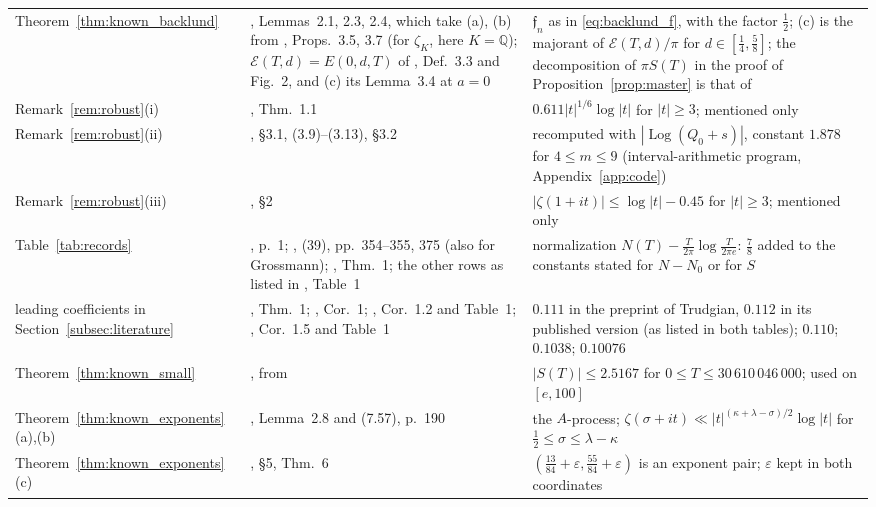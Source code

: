 \documentclass[11pt,a4paper]{article}
\makeatletter
\numberwithin{equation}{section}
\DeclareRobustCommand{\CGref}[1]{\ref{#1}}
\DeclareRobustCommand{\CGeqref}[1]{\eqref{#1}}
\DeclareRobustCommand{\CGcite}[2][]{\if\relax\detokenize{#1}\relax\cite{#2}\else\cite[#1]{#2}\fi}
\let\CG@origref\ref
\let\CG@origeqref\eqref
\newcommand{\CG@gettip}[1]{\@ifundefined{CGTip@#1}{#1}{\csname CGTip@#1\endcsname}}
\newcommand{\CG@getbib}[1]{\@ifundefined{CGBib@#1}{#1}{\csname CGBib@#1\endcsname}}
\DeclareRobustCommand{\CGref}[1]{\pdftooltip{\CG@origref{#1}}{\CG@gettip{#1}}}
\DeclareRobustCommand{\CGeqref}[1]{\pdftooltip{\CG@origeqref{#1}}{\CG@gettip{#1}}}
\DeclareRobustCommand{\CGcite}[2][]{\pdftooltip{\if\relax\detokenize{#1}\relax\cite{#2}\else\cite[#1]{#2}\fi}{\CG@getbib{#2}}}
\theoremstyle{definition}
\theoremstyle{remark}
\newcommand{\Nz}{N_0} %
\makeatother
\begin{document}
\begin{center}
\begin{longtable}{p{}p{}p{}}
Theorem~\CGref{thm:known_backlund} & \CGcite{BellottiWong2025}, Lemmas~2.1, 2.3, 2.4, which take (a), (b) from \CGcite{HasanalizadeShenWong2021}, Props.~3.5, 3.7 (for $\zeta_K$, here $K=\mathbb Q$); $\mathcal E(T,d)=E(0,d,T)$ of \CGcite{BennettEtAl2021}, Def.~3.3 and Fig.~2, and (c) its Lemma~3.4 at $a=0$ & $\mathfrak f_n$ as in \CGeqref{eq:backlund_f}, with the factor $\frac12$; (c) is the majorant of $\mathcal E(T,d)/\pi$ for $d\in[\frac14,\frac58]$; the decomposition of $\pi S(T)$ in the proof of Proposition~\CGref{prop:master} is that of \CGcite[\S3]{BellottiWong2025}\\
Remark~\CGref{rem:robust}(i) & \CGcite{Revers2026}, Thm.~1.1 & $0.611|t|^{1/6}\log|t|$ for $|t|\ge3$; mentioned only\\
Remark~\CGref{rem:robust}(ii) & \CGcite{Yang2024}, \S3.1, (3.9)--(3.13), \S3.2 & recomputed with $|\operatorname{Log}(Q_0+s)|$, constant $1.878$ for $4\le m\le9$ (interval-arithmetic program, Appendix~\CGref{app:code})\\
Remark~\CGref{rem:robust}(iii) & \CGcite{HiaryLeongYang2024}, \S2 & $|\zeta(1+it)|\le\log|t|-0.45$ for $|t|\ge3$; mentioned only\\
Table~\CGref{tab:records} & \CGcite{VonMangoldt1905}, p.~1; \CGcite{Backlund1918}, (39), pp.~354--355, 375 (also for Grossmann); \CGcite{Trudgian2012}, Thm.~1; the other rows as listed in \CGcite{BellottiWong2025}, Table~1 & normalization $N(T)-\frac T{2\pi}\log\frac T{2\pi e}$: $\frac78$ added to the constants stated for $N-\Nz$ or for $S$\\
leading coefficients in Section~\CGref{subsec:literature} & \CGcite{Trudgian2014}, Thm.~1; \CGcite{PlattTrudgian2015}, Cor.~1; \CGcite{HasanalizadeShenWong2022}, Cor.~1.2 and Table~1; \CGcite{BellottiWong2025}, Cor.~1.5 and Table~1 & $0.111$ in the preprint of Trudgian, $0.112$ in its published version (as listed in both tables); $0.110$; $0.1038$; $0.10076$\\
Theorem~\CGref{thm:known_small} & \CGcite[(1.2)]{BellottiWong2025}, from \CGcite{Platt2017} & $|S(T)|\le2.5167$ for $0\le T\le30\,610\,046\,000$; used on $[e,100]$\\
Theorem~\CGref{thm:known_exponents}(a),(b) & \CGcite{Ivic1985}, Lemma~2.8 and (7.57), p.~190 & the $A$-process; $\zeta(\sigma+it)\ll|t|^{(\kappa+\lambda-\sigma)/2}\log|t|$ for $\frac12\le\sigma\le\lambda-\kappa$\\
Theorem~\CGref{thm:known_exponents}(c) & \CGcite{Bourgain2017}, \S5, Thm.~6 & $(\frac{13}{84}+\varepsilon,\frac{55}{84}+\varepsilon)$ is an exponent pair; $\varepsilon$ kept in both coordinates\\

\end{longtable}
\end{center}
\end{document}
